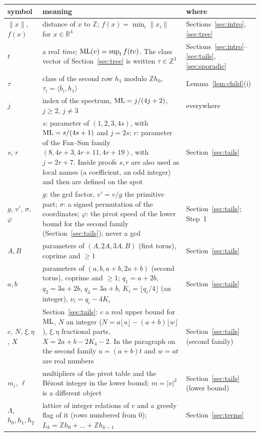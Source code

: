\documentclass[11pt]{article}
\theoremstyle{remark}
\newcommand{\R}{\mathbb{R}}
\newcommand{\Z}{\mathbb{Z}}
\newcommand{\dist}[1]{\lVert #1\rVert}
\begin{document}
{\small
\begin{longtable}{p{2.9cm}p{7.6cm}p{4.0cm}}
\toprule
symbol & meaning & where\\
\midrule
\endhead
$\dist x$, $f(x)$ & distance of $x$ to $\Z$; $f(x)=\min_i\dist{x_i}$ for $x\in\R^4$ & Sections~\ref{sec:intro}, \ref{sec:tree}\\
$t$ & a real \emph{time}; $\mathrm{ML}(v)=\sup_tf(tv)$. The class vector of Section~\ref{sec:tree} is written $\tau\in\Z^3$ & Sections~\ref{sec:intro}--\ref{sec:tails}, \ref{sec:sporadic}\\
$\tau$ & class of the second row $h_1$ modulo $\Z h_0$, $\tau_i=\langle b_i,h_1\rangle$ & Lemma~\ref{lem:child}(i)\\
$j$ & index of the spectrum, $\mathrm{ML}=j/(4j+2)$, $j\ge2$, $j\ne3$ & everywhere\\
$s$, $r$ & $s$: parameter of $(1,2,3,4s)$, with $\mathrm{ML}=s/(4s+1)$ and $j=2s$; $r$: parameter of the Fan--Sun family $(8,4r+3,4r+11,4r+19)$, with $j=2r+7$. Inside proofs $s,r$ are also used as local names (a coefficient, an odd integer) and then are defined on the spot & Section~\ref{sec:tails}\\
$g$, $v'$, $\sigma$, $\varphi$ & $g$: the gcd factor, $v'=v/g$ the primitive part; $\sigma$: a signed permutation of the coordinates; $\varphi$: the pivot speed of the lower bound for the second family (Section~\ref{sec:tails}); never a gcd & Section~\ref{sec:tails}; Step~1\\
$A,B$ & parameters of $(A,2A,3A,B)$ (first torus), coprime and $\ge1$ & Section~\ref{sec:tails}\\
$a,b$ & parameters of $(a,b,a+b,2a+b)$ (second torus), coprime and $\ge1$; $q_1=a+2b$, $q_2=3a+2b$, $q_4=3a+b$, $K_i=\lfloor q_i/4\rfloor$ (an integer), $\nu_i=q_i-4K_i$ & Section~\ref{sec:tails}\\
$c$, $N$, $\xi,\eta$, $X$ & Section~\ref{sec:tails}: $c$ a real upper bound for $\mathrm{ML}$, $N$ an integer ($N=a\lfloor u\rfloor-(a+b)\lfloor w\rfloor$), $\xi,\eta$ fractional parts, $X=2a+b-2K_4-2$. In the paragraph on the second family $u=(a+b)t$ and $w=at$ are real numbers & Section~\ref{sec:tails} (second family)\\
$m_i$, $\ell$ & multipliers of the pivot table and the B\'ezout integer in the lower bound; $m=|v|^2$ is a different object & Section~\ref{sec:tails} (lower bound)\\
$\Lambda$, $h_0,h_1,h_2$ & lattice of integer relations of $v$ and a greedy flag of it (rows numbered from $0$); $L_k=\Z h_0+\dots+\Z h_{k-1}$ & Section~\ref{sec:terms}\\

\end{longtable}}
\end{document}
